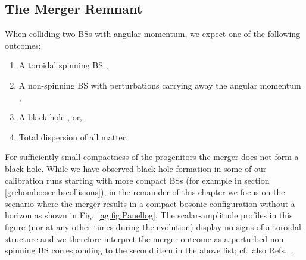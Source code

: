 \subsection{The Merger Remnant}\label{ag:sec:Remannt}



When colliding two BSs with angular momentum, we
expect one of the following outcomes:
\begin{enumerate}
    \item A toroidal spinning BS
        \cite{PhysRevD.90.024068,Yoshida:1997qf,1996rscc.conf..138S,Siemonsen:2020hcg},
    \item A non-spinning BS with perturbations carrying away the angular
        momentum
        \cite{Macedo:2013jja,Macedo:2016wgh,Yoshida:1994xi,Flores:2019iwp},
    \item A black hole \cite{Helfer:2018vtq,Palenzuela:2017kcg,Bezares:2018qwa}, or,
    \item Total dispersion of all matter.
\end{enumerate}
For sufficiently small compactness of the progenitors the merger does not form a black hole. While we have observed black-hole
formation in some of our calibration runs starting with more compact
BSs (for example in section \ref{grchombo:sec:bscollisions}), in the remainder of this chapter we focus on the scenario
where the merger results in a compact bosonic configuration
without a horizon as shown in Fig.~\ref{ag:fig:Panellog}.
The scalar-amplitude profiles in this figure (nor at any other
times during the evolution) display no signs
of a toroidal structure and we therefore interpret the merger
outcome as a perturbed non-spinning BS corresponding to the
second item in the above list; cf.~also
Refs.~\cite{Palenzuela:2017kcg,Bezares:2018qwa}.


